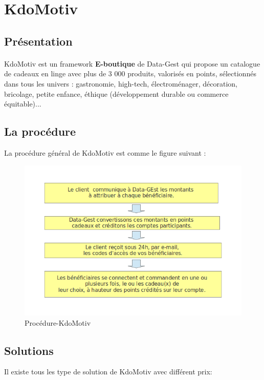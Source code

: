 \section{KdoMotiv}
\justifying
\subsection{Présentation}
\paragraph{}

KdoMotiv est un framework \textbf{E-boutique} de Data-Gest qui propose un catalogue de cadeaux en linge avec plus de 3 000 produits, valorisés en points, sélectionnés dans tous les univers : gastronomie, high-tech, électroménager, décoration, bricolage, petite enfance, éthique (développement durable ou commerce équitable)...

\subsection{La procédure}
La procédure général de KdoMotiv est comme le figure suivant :


\begin{figure}[hbtp]
\center
\includegraphics[width=15cm]{body/images/Procedure-kdomotiv.png}
\caption{Procédure-KdoMotiv}
\end{figure}


\subsection{Solutions}
Il existe tous les type de solution de KdoMotiv avec différent prix:

